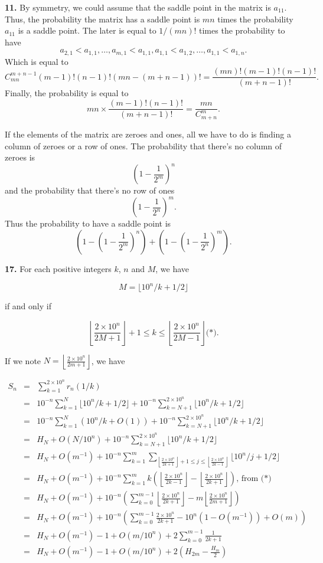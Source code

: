 \documentclass[a4paper,12pt]{article}
\newcommand{\newpar}[1]{\bigskip \noindent \textbf{#1.}}
\begin{document}
\newpar{11} By symmetry, we could assume that the saddle point in the
matrix is $a_{11}$.  Thus, the probability the matrix has a saddle
point is $m n$ times the probability $a_{11}$ is a saddle point.  The
later is equal to $1/(mn)!$ times the probability to have
\[ a_{2,1} < a_{1,1}, \ldots, a_{m,1} < a_{1,1}, a_{1,1} < a_{1,2},
\ldots, a_{1,1} < a_{1,n}.\]
Which is equal to
\[ C_{mn}^{m+n-1} (m-1)! (n-1)! (mn - (m+n-1))! =
\frac{(mn)!(m-1)!(n-1)!}{(m+n-1)!}.\]
Finally, the probability is equal to
\[ m n \times \frac{(m-1)!(n-1)!}{(m+n-1)!} = \frac{mn}{C_{m+n}^m}.\]

If the elements of the matrix are zeroes and ones, all we have to do
is finding a column of zeroes or a row of ones.  The probability that
there's no column of zeroes is
\[ \left(1 - \frac{1}{2^m}\right)^n\]
and the probability that there's no row of ones
\[ \left(1 - \frac{1}{2^n}\right)^m.\]
Thus the probability to have a saddle point is
\[ \left(1 - \left(1 - \frac{1}{2^m}\right)^n\right)
+  \left(1 - \left(1 - \frac{1}{2^n}\right)^m\right).\]

\newpar{17} For each positive integers $k$, $n$ and $M$, we have

\[ M = \lfloor 10^n/k + 1/2\rfloor \]

if and only if

\[ \left\lfloor \frac{2\times 10^n}{2M+1}\right\rfloor + 1 \le k \le
\left\lfloor \frac{2\times 10^n}{2M-1}\right\rfloor\mbox{(*)}.\]

If we note $N = \left\lfloor\frac{2\times10^n}{2m+1}\right\rfloor$, we
have

\begin{eqnarray*}
  S_n &=& \sum_{k=1}^{2\times10^n}r_n(1/k) \\
  &=& 10^{-n} \sum_{k=1}^N \lfloor 10^n/k + 1/2\rfloor + 10^{-n}
  \sum_{k=N+1}^{2\times10^n} \lfloor 10^n/k + 1/2\rfloor \\
  &=& 10^{-n} \sum_{k=1}^N (10^n/k + O(1)) +
  10^{-n} \sum_{k=N+1}^{2\times10^n} \lfloor 10^n/k + 1/2\rfloor \\
  &=& H_N + O(N/10^n) +  10^{-n} \sum_{k=N+1}^{2\times10^n} \lfloor 10^n/k +
  1/2\rfloor \\
  &=& H_N + O(m^{-1}) + 10^{-n} \sum_{k=1}^m
  \sum_{\left\lfloor\frac{2\times10^n}{2k+1}\right\rfloor + 1\le j \le
    \left\lfloor\frac{2\times 10^n}{2k-1}\right\rfloor} \lfloor 10^n/j
  + 1/2\rfloor \\
  &=& H_N + O(m^{-1}) + 10^{-n} \sum_{k=1}^m k
  \left(\left\lfloor\frac{2\times 10^n}{2k-1}\right\rfloor -
  \left\lfloor\frac{2\times10^n}{2k+1}\right\rfloor\right),\,\mbox{from
    (*)} \\
  &=& H_N + O(m^{-1}) + 10^{-n} \left( \sum_{k=0}^{m-1}
  \left\lfloor\frac{2\times10^n}{2k+1}\right\rfloor -
  m\left\lfloor\frac{2\times10^n}{2m+1}\right\rfloor\right) \\
  &=& H_N + O(m^{-1}) + 10^{-n} \left(
  \sum_{k=0}^{m-1} \frac{2\times 10^n}{2k+1} - 10^n (1 - O(m^{-1})) + O(m)
  \right) \\
  &=& H_N + O(m^{-1}) - 1 + O(m/10^n) + 2 \sum_{k=0}^{m-1}
  \frac{1}{2k+1} \\
  &=& H_N + O(m^{-1}) - 1 + O(m/10^n) + 2 \left(H_{2m} -
  \frac{H_m}{2}\right)
\end{eqnarray*}
\end{document}
